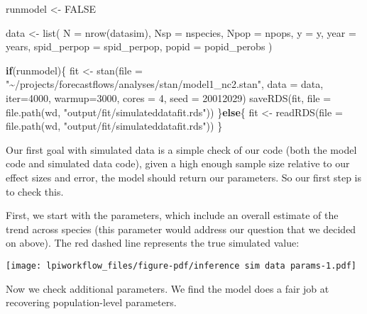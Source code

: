 \documentclass[
  letterpaper,
  DIV=11,
  numbers=noendperiod]{scrartcl}
\newenvironment{Shaded}{\begin{snugshade}}{\end{snugshade}}
\newcommand{\AttributeTok}[1]{\textcolor[rgb]{0.40,0.45,0.13}{#1}}
\newcommand{\ConstantTok}[1]{\textcolor[rgb]{0.56,0.35,0.01}{#1}}
\newcommand{\ControlFlowTok}[1]{\textcolor[rgb]{0.00,0.23,0.31}{\textbf{#1}}}
\newcommand{\DecValTok}[1]{\textcolor[rgb]{0.68,0.00,0.00}{#1}}
\newcommand{\FunctionTok}[1]{\textcolor[rgb]{0.28,0.35,0.67}{#1}}
\newcommand{\NormalTok}[1]{\textcolor[rgb]{0.00,0.23,0.31}{#1}}
\newcommand{\OtherTok}[1]{\textcolor[rgb]{0.00,0.23,0.31}{#1}}
\newcommand{\StringTok}[1]{\textcolor[rgb]{0.13,0.47,0.30}{#1}}
\begin{document}
\begin{Shaded}
\begin{Highlighting}[]
\NormalTok{runmodel }\OtherTok{\textless{}{-}} \ConstantTok{FALSE}

\NormalTok{data }\OtherTok{\textless{}{-}} \FunctionTok{list}\NormalTok{(}
  \AttributeTok{N =} \FunctionTok{nrow}\NormalTok{(datasim),}
  \AttributeTok{Nsp =}\NormalTok{ nspecies,}
  \AttributeTok{Npop =}\NormalTok{ npops,}
  \AttributeTok{y =}\NormalTok{ y,}
  \AttributeTok{year =}\NormalTok{ years,}
  \AttributeTok{spid\_perpop =}\NormalTok{ spid\_perpop,}
  \AttributeTok{popid =}\NormalTok{ popid\_perobs}
\NormalTok{)}

\ControlFlowTok{if}\NormalTok{(runmodel)\{}
\NormalTok{  fit }\OtherTok{\textless{}{-}} \FunctionTok{stan}\NormalTok{(}\AttributeTok{file =} \StringTok{"\textasciitilde{}/projects/forecastflows/analyses/stan/model1\_nc2.stan"}\NormalTok{,}
            \AttributeTok{data =}\NormalTok{ data,  }\AttributeTok{iter=}\DecValTok{4000}\NormalTok{, }\AttributeTok{warmup=}\DecValTok{3000}\NormalTok{, }\AttributeTok{cores =} \DecValTok{4}\NormalTok{, }\AttributeTok{seed =} \DecValTok{20012029}\NormalTok{)}
  \FunctionTok{saveRDS}\NormalTok{(fit, }\AttributeTok{file =} \FunctionTok{file.path}\NormalTok{(wd, }\StringTok{"output/fit/simulateddatafit.rds"}\NormalTok{))}
\NormalTok{\}}\ControlFlowTok{else}\NormalTok{\{}
\NormalTok{  fit }\OtherTok{\textless{}{-}} \FunctionTok{readRDS}\NormalTok{(}\AttributeTok{file =} \FunctionTok{file.path}\NormalTok{(wd, }\StringTok{"output/fit/simulateddatafit.rds"}\NormalTok{))}
\NormalTok{\}}
\end{Highlighting}
\end{Shaded}

Our first goal with simulated data is a simple check of our code (both
the model code and simulated data code), given a high enough sample size
relative to our effect sizes and error, the model should return our
parameters. So our first step is to check this.

First, we start with the parameters, which include an overall estimate
of the trend across species (this parameter would address our question
that we decided on above). The red dashed line represents the true
simulated value:

\texttt{[image: lpiworkflow\_files/figure-pdf/inference sim data params-1.pdf]}

Now we check additional parameters. We find the model does a fair job at
recovering population-level parameters.
\end{document}
